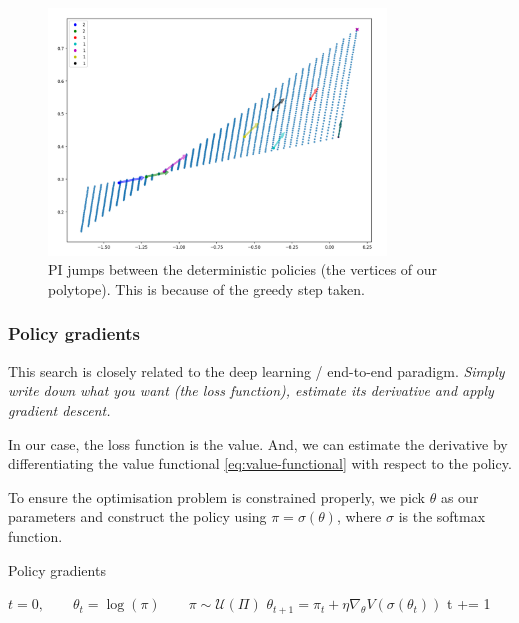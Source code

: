 \begin{figure}[h!]
\centering
\includegraphics[width=0.8\textwidth,height=0.4\textheight]{../../pictures/figures/pi-polytope.png}
\caption{PI jumps between the deterministic policies (the vertices of our polytope).
This is because of the greedy step taken.}
\end{figure}

\newpage

\subsubsection{Policy gradients}

This search is closely related to the deep learning / end-to-end paradigm.
\textit{Simply write down what you want (the loss function),
estimate its derivative and apply gradient descent.}

In our case, the loss function is the value. And, we can estimate the derivative
by differentiating the value functional \ref{eq:value-functional} with respect to the policy.

To ensure the optimisation problem is constrained properly, we pick $\theta$ as our parameters and
construct the policy using $\pi = \sigma(\theta)$, where $\sigma$ is the softmax function.


\begin{algorithm}
\caption{Policy gradients}
\begin{algorithmic}[1]

  \State $t=0, \quad\quad \theta_t = \log(\pi) \quad\quad \pi \sim \mathcal U(\Pi)$ 
    \State $\theta_{t+1} = \pi_t + \eta \nabla_{\theta} V(\sigma(\theta_t))$ 
    \State t += 1
  \EndWhile
  \State {}
\EndProcedure

\end{algorithmic}
\end{algorithm}

